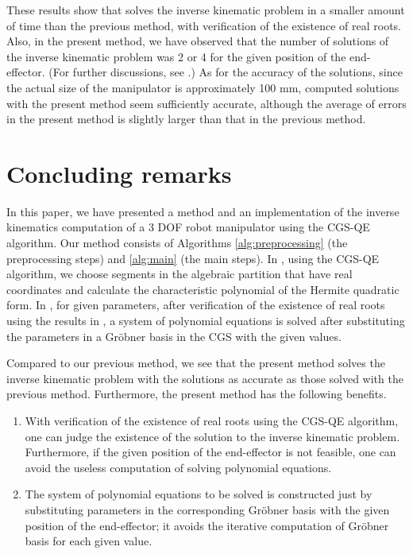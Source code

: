 \documentclass{birkjour}
\theoremstyle{plain}
\theoremstyle{definition}
\begin{document}
    These results show that  solves the inverse kinematic problem in a smaller amount of time than the previous method, 
    with verification of the existence of real roots.
    Also, in the present method, we have observed that the number of solutions of the 
    inverse kinematic problem was 2 or 4 for the given position of the end-effector. 
    (For further discussions, see .)
    As for the accuracy of the solutions, since the actual size of the manipulator is 
    approximately 100 mm, computed solutions with the present method seem sufficiently accurate,
    although the average of errors in the present method 
    is slightly larger than that in the previous method.

    

    \section{Concluding remarks}
    \label{sec:remark}

    In this paper, we have presented a method and an implementation of 
    the inverse kinematics computation of a 3 DOF robot manipulator
    using the CGS-QE algorithm.
    Our method consists of 
    Algorithms \ref{alg:preprocessing} (the preprocessing steps) and
    \ref{alg:main} (the main steps).
    In ,
    using the CGS-QE algorithm, 
    we choose segments in the algebraic partition that have     
    real coordinates and calculate the characteristic polynomial of 
    the Hermite quadratic form.
    In ,
    for given parameters, after verification of the existence of 
    real roots using the results in ,
    a system of polynomial equations is solved after substituting the parameters in 
    a Gr\"obner basis in the CGS with the given values.

    Compared to our previous method, we see that the present method solves
    the inverse kinematic problem with the solutions as accurate as those solved 
    with the previous method. Furthermore, the present method has the following 
    benefits.
    \begin{enumerate}
        \item With verification of the existence of real roots using the CGS-QE algorithm, 
        one can judge the existence of the solution to the inverse kinematic problem. Furthermore, 
        if the given position of the end-effector is not feasible, one can avoid the useless computation of solving polynomial equations.
        \item The system of polynomial equations to be solved is constructed just by substituting parameters in the corresponding Gr\"obner basis with the given position of the 
        end-effector; it avoids the iterative computation of Gr\"obner basis for each given value.
    \end{enumerate}
\end{document}
